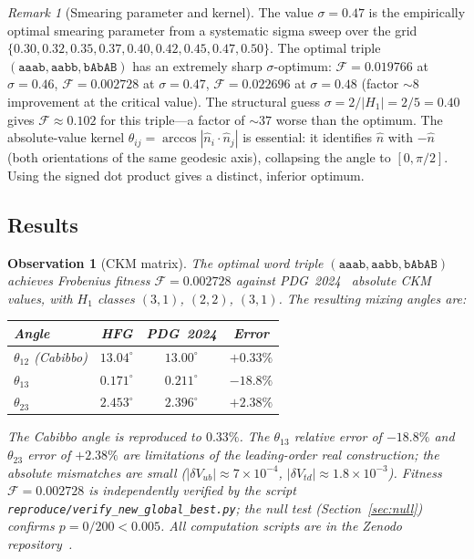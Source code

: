 \documentclass[11pt,a4paper]{article}
\newtheorem{observation}[theorem]{Observation}
\theoremstyle{remark}
\newtheorem{remark}[theorem]{Remark}
\begin{document}
\begin{remark}[Smearing parameter and kernel]
The value $\sigma = 0.47$ is the empirically optimal smearing parameter
from a systematic sigma sweep over the grid
$\{0.30, 0.32, 0.35, 0.37, 0.40, 0.42, 0.45, 0.47, 0.50\}$.
The optimal triple $(\mathtt{aaab}, \mathtt{aabb}, \mathtt{bAbAB})$ has an
extremely sharp $\sigma$-optimum: $\mathcal{F} = 0.019766$ at $\sigma=0.46$,
$\mathcal{F} = 0.002728$ at $\sigma = 0.47$, $\mathcal{F} = 0.022696$ at
$\sigma=0.48$ (factor $\sim 8$ improvement at the critical value).
The structural guess $\sigma = 2/|H_1| = 2/5 = 0.40$ gives $\mathcal{F}
\approx 0.102$ for this triple---a factor of $\sim 37$ worse than the optimum.
The absolute-value kernel $\theta_{ij} = \arccos|\hat{n}_i \cdot \hat{n}_j|$
is essential: it identifies $\hat{n}$ with $-\hat{n}$ (both orientations of
the same geodesic axis), collapsing the angle to $[0,\pi/2]$.
Using the signed dot product gives a distinct, inferior optimum.
\end{remark}

\subsection{Results}

\begin{observation}[CKM matrix]
\label{obs:ckm}
The optimal word triple $(\mathtt{aaab}, \mathtt{aabb}, \mathtt{bAbAB})$
achieves Frobenius fitness $\mathcal{F} = 0.002728$ against PDG~2024~\cite{PDG2024}
absolute CKM values, with $H_1$ classes $(3,1)$, $(2,2)$, $(3,1)$.
The resulting mixing angles are:

\begin{center}
\begin{tabular}{lccc}
\toprule
Angle & HFG & PDG~2024 & Error \\
\midrule
$\theta_{12}$ (Cabibbo) & $13.04^\circ$ & $13.00^\circ$ & $+0.33\%$ \\
$\theta_{13}$ & $0.171^\circ$ & $0.211^\circ$ & $-18.8\%$ \\
$\theta_{23}$ & $2.453^\circ$ & $2.396^\circ$ & $+2.38\%$ \\
\bottomrule
\end{tabular}
\end{center}

The Cabibbo angle is reproduced to $0.33\%$.
The $\theta_{13}$ relative error of $-18.8\%$ and $\theta_{23}$ error of $+2.38\%$
are limitations of the leading-order real construction;
the absolute mismatches are small ($|\delta V_{ub}| \approx 7\times 10^{-4}$,
$|\delta V_{td}| \approx 1.8\times 10^{-3}$).
Fitness $\mathcal{F} = 0.002728$ is independently verified by the script
\texttt{reproduce/verify\_new\_global\_best.py}; the null test
(Section~\ref{sec:null}) confirms $p = 0/200 < 0.005$.
All computation scripts are in the Zenodo repository~\cite{Gentry:zenodo}.
\end{observation}
\end{document}
